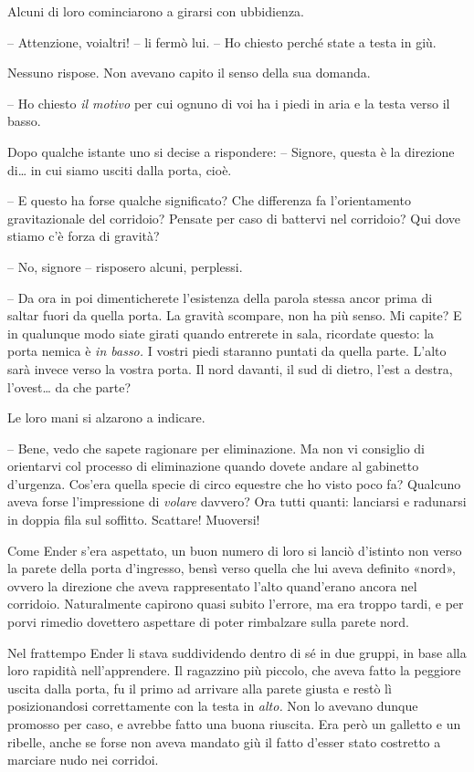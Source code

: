 {Alcuni di loro cominciarono a girarsi con ubbidienza.}

{-- Attenzione, voialtri! -- li fermò lui. -- Ho chiesto perché state a
	testa in giù.}

{Nessuno rispose. Non avevano capito il senso della sua domanda.}

{-- Ho chiesto \emph{il motivo} per cui ognuno di voi ha i piedi in aria
	e la testa verso il basso.}

{Dopo qualche istante uno si decise a rispondere: -- Signore, questa è
	la direzione di\ldots{} in cui siamo usciti dalla porta, cioè.}

{-- E questo ha forse qualche significato? Che differenza fa
	l'orientamento gravitazionale del corridoio? Pensate per caso di
	battervi nel corridoio? Qui dove stiamo c'è forza di gravità?}

{-- No, signore -- risposero alcuni, perplessi.}

{-- Da ora in poi dimenticherete l'esistenza della parola stessa ancor
	prima di saltar fuori da quella porta. La gravità scompare, non ha più
	senso. Mi capite? E in qualunque modo siate girati quando entrerete in
	sala, ricordate questo: la porta nemica è \emph{in basso.} I vostri
	piedi staranno puntati da quella parte. L'alto sarà invece verso la
	vostra porta. Il nord davanti, il sud di dietro, l'est a destra,
	l'ovest\ldots{} da che parte?}

{Le loro mani si alzarono a indicare.}

{-- Bene, vedo che sapete ragionare per eliminazione. Ma non vi
	consiglio di orientarvi col processo di eliminazione quando dovete
	andare al gabinetto d'urgenza. Cos'era quella specie di circo equestre
	che ho visto poco fa? Qualcuno aveva forse l'impressione di
	\emph{volare} davvero? Ora tutti quanti: lanciarsi e radunarsi in doppia
	fila sul soffitto. Scattare! Muoversi!}

{Come Ender s'era aspettato, un buon numero di loro si lanciò d'istinto
	non verso la parete della porta d'ingresso, bensì verso quella che lui
	aveva definito «nord», ovvero la direzione che aveva rappresentato
	l'alto quand'erano ancora nel corridoio. Naturalmente capirono quasi
	subito l'errore, ma era troppo tardi, e per porvi rimedio dovettero
	aspettare di poter rimbalzare sulla parete nord.}

{Nel frattempo Ender li stava suddividendo dentro di sé in due gruppi,
	in base alla loro rapidità nell'apprendere. Il ragazzino più piccolo,
	che aveva fatto la peggiore uscita dalla porta, fu il primo ad arrivare
	alla parete giusta e restò lì posizionandosi correttamente con la testa
	in \emph{alto.} Non lo avevano dunque promosso per caso, e avrebbe fatto
	una buona riuscita. Era però un galletto e un ribelle, anche se forse
	non aveva mandato giù il fatto d'esser stato costretto a marciare nudo
	nei corridoi.}

